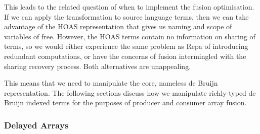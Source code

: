 This leads to the related question of when to implement the fusion optimisation.
If we can apply the transformation to source language terms, then we can take
advantage of the HOAS representation that gives us naming and scope of variables
of free. However, the HOAS terms contain no information on sharing of terms, so
we would either experience the same problem as Repa of introducing redundant
computations, or have the concerns of fusion intermingled with the sharing
recovery process. Both alternatives are unappealing.

This means that we need to manipulate the core, nameless de Bruijn representation. The following sections discuss how we manipulate
richly-typed de Bruijn indexed terms for the purposes of producer and consumer
array fusion.


\subsubsection{Delayed Arrays}

